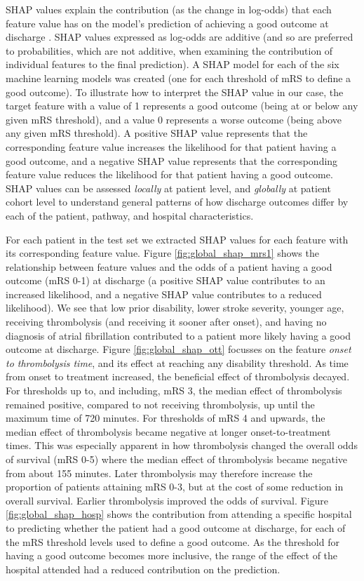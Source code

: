 SHAP values explain the contribution (as the change in log-odds) that each feature value has on the model’s prediction of achieving a good outcome at discharge \cite{lundberg_unified_2017}. SHAP values expressed as log-odds are additive (and so are preferred to probabilities, which are not additive, when examining the contribution of individual features to the final prediction). A SHAP model for each of the six machine learning models was created (one for each threshold of mRS to define a good outcome). To illustrate how to interpret the SHAP value in our case, the target feature with a value of 1 represents a good outcome (being at or below any given mRS threshold), and a value 0 represents a worse outcome (being above any given mRS threshold). A positive SHAP value represents that the corresponding feature value increases the likelihood for that patient having a good outcome, and a negative SHAP value represents that the corresponding feature value reduces the likelihood for that patient having a good outcome. SHAP values can be assessed \textit{locally} at patient level, and \textit{globally} at patient cohort level to understand general patterns of how discharge outcomes differ by each of the patient, pathway, and hospital characteristics.

For each patient in the test set we extracted SHAP values for each feature with its corresponding feature value. Figure \ref{fig:global_shap_mrs1} shows the relationship between feature values and the odds of a patient having a good outcome (mRS 0-1) at discharge (a positive SHAP value contributes to an increased likelihood, and a negative SHAP value contributes to a reduced likelihood). We see that low prior disability, lower stroke severity, younger age, receiving thrombolysis (and receiving it sooner after onset), and having no diagnosis of atrial fibrillation contributed to a patient more likely having a good outcome at discharge. Figure \ref{fig:global_shap_ott} focusses on the feature \textit{onset to thrombolysis time}, and its effect at reaching any disability threshold. As time from onset to treatment increased, the beneficial effect of thrombolysis decayed. For thresholds up to, and including, mRS 3, the median effect of thrombolysis remained positive, compared to not receiving thrombolysis, up until the maximum time of 720 minutes. For thresholds of mRS 4 and upwards, the median effect of thrombolysis became negative at longer onset-to-treatment times. This was especially apparent in how thrombolysis changed the overall odds of survival (mRS 0-5) where the median effect of thrombolysis became negative from about 155 minutes. Later thrombolysis may therefore increase the proportion of patients attaining mRS 0-3, but at the cost of some reduction in overall survival. Earlier thrombolysis improved the odds of survival. Figure \ref{fig:global_shap_hosp} shows the contribution from attending a specific hospital to predicting whether the patient had a good outcome at discharge, for each of the mRS threshold levels used to define a good outcome. As the threshold for having a good outcome becomes more inclusive, the range of the effect of the hospital attended had a reduced contribution on the prediction.


